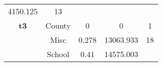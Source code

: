 \documentclass[]{book}
\theoremstyle{definition}
\theoremstyle{definition}
\theoremstyle{definition}
\theoremstyle{remark}
\begin{document}
\begin{longtable}[]{@{}ccccc@{}}
\begin{minipage}[t]{0.14\columnwidth}
4150.125\strut
\end{minipage} & \begin{minipage}[t]{0.14\columnwidth}\centering\strut
13\strut
\end{minipage}\tabularnewline
\begin{minipage}[t]{0.11\columnwidth}\centering\strut
\textbf{t3}\strut
\end{minipage} & \begin{minipage}[t]{0.12\columnwidth}\centering\strut
County\strut
\end{minipage} & \begin{minipage}[t]{0.11\columnwidth}\centering\strut
0\strut
\end{minipage} & \begin{minipage}[t]{0.14\columnwidth}\centering\strut
0\strut
\end{minipage} & \begin{minipage}[t]{0.14\columnwidth}\centering\strut
1\strut
\end{minipage}\tabularnewline
\begin{minipage}[t]{0.11\columnwidth}\centering\strut
\strut
\end{minipage} & \begin{minipage}[t]{0.12\columnwidth}\centering\strut
Misc\strut
\end{minipage} & \begin{minipage}[t]{0.11\columnwidth}\centering\strut
0.278\strut
\end{minipage} & \begin{minipage}[t]{0.14\columnwidth}\centering\strut
13063.933\strut
\end{minipage} & \begin{minipage}[t]{0.14\columnwidth}\centering\strut
18\strut
\end{minipage}\tabularnewline
\begin{minipage}[t]{0.11\columnwidth}\centering\strut
\strut
\end{minipage} & \begin{minipage}[t]{0.12\columnwidth}\centering\strut
School\strut
\end{minipage} & \begin{minipage}[t]{0.11\columnwidth}\centering\strut
0.41\strut
\end{minipage} & \begin{minipage}[t]{0.14\columnwidth}\centering\strut
14575.003\strut
\end{minipage} & \begin{minipage}[t]{0.14\columnwidth}\centering\strut

\end{minipage}
\end{longtable}
\end{document}
